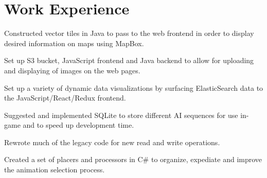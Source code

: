 \documentclass[letterpaper]{deedy-resume-modified} %
\begin{document}
\hfill
%
%
\begin{minipage}[t]{0.66\textwidth} %
\vspace{5pt}

\section{Work Experience}


\vspace{\topsep}
\begin{tightitemize}
\item Constructed vector tiles in Java to pass to the web frontend in order to display desired information on maps using MapBox.
\item Set up S3 bucket, JavaScript frontend and Java backend to allow for uploading and displaying of images on the web pages.
\item Set up a variety of dynamic data visualizations by surfacing ElasticSearch data to the JavaScript/React/Redux frontend.
\end{tightitemize}

\sectionspace %

\vspace{\topsep}
\begin{tightitemize}
\vspace{-10pt}
\item Suggested and implemented SQLite to store different AI sequences for use in-game and to speed up development time.  
\item Rewrote much of the legacy \CPP \hspace{1pt}code for new read and write operations.
\item Created a set of placers and processors in C\# to organize, expediate and improve the animation selection process.
\end{tightitemize}


\end{minipage}
\end{document}
